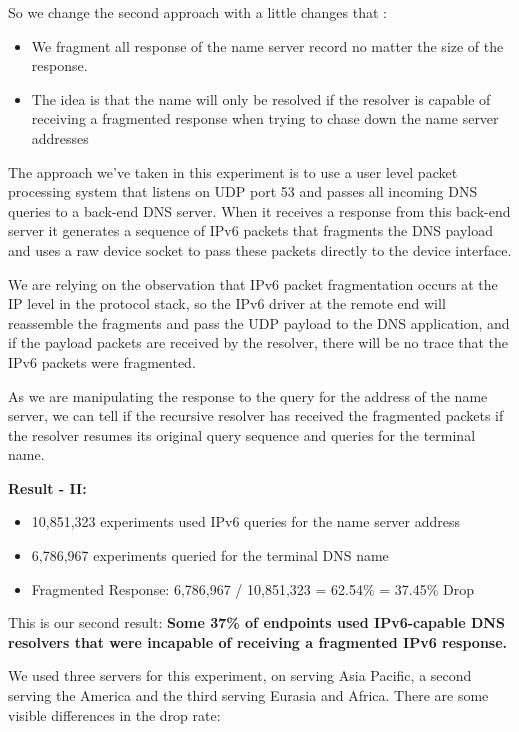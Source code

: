 So we change the second approach with a little changes that :

\begin{itemize}
  \item We fragment all response of the name server record no 
  matter the size of the response.
  \item The idea is  that the name will only be resolved 
  if the resolver is capable of   receiving a fragmented 
  response when trying to chase down the name server addresses
\end{itemize}

The approach we’ve taken in this experiment is to use a user level 
packet processing system that listens on UDP port 53 and passes 
all incoming DNS queries to a back-end DNS server. When it 
receives a response from this back-end server it generates 
a sequence of IPv6 packets that fragments the DNS payload 
and uses a raw device socket to pass these packets directly 
to the device interface.

We are relying on the observation that IPv6 packet fragmentation 
occurs at the IP level in the protocol stack, so the IPv6 driver 
at the remote end will reassemble the fragments and pass the 
UDP payload to the DNS application, and if the payload packets 
are received by the resolver, there will be no trace that the 
IPv6 packets were fragmented.

As we are manipulating the response to the query for the 
address of the name server, we can tell if the recursive 
resolver has received the fragmented packets if the resolver 
resumes its original query sequence and queries for the terminal name.


\textbf{Result - II:}

\begin{itemize}
  \item 10,851,323 experiments used IPv6 queries for the name server address
  \item 6,786,967 experiments queried for the terminal DNS name
  \item Fragmented Response: 6,786,967 / 10,851,323 = 62.54\% = 37.45\% Drop
\end{itemize}

This is our second result: \textbf{Some 37\% of endpoints used 
IPv6-capable DNS resolvers that were incapable of receiving a 
fragmented IPv6 response.}

We used three servers for this experiment, on serving Asia 
Pacific, a second serving the America and the third serving 
Eurasia and Africa. There are some visible differences in the 
drop rate:

